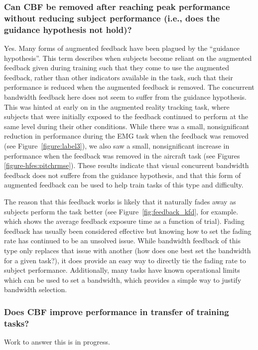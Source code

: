 \subsubsection{Can CBF be removed after reaching peak performance without reducing subject performance (i.e., does the guidance hypothesis not hold)?}
Yes.
Many forms of augmented feedback have been plagued by the ``guidance hypothesis''.
This term describes when subjects become reliant on the augmented feedback given during training such that they come to use the augmented feedback, rather than other indicators available in the task, such that their performance is reduced when the augmented feedback is removed.
The concurrent bandwidth feedback here does not seem to suffer from the guidance hypothesis.
This was hinted at early on in the augmented reality tracking task, where subjects that were initially exposed to the feedback continued to perform at the same level during their other conditions.
While there was a small, nonsignificant reduction in performance during the EMG task when the feedback was removed (see Figure~\ref{figure:label3}), we also saw a small, nonsignificant increase in performance when the feedback was removed in the aircraft task (see Figures \ref{figure-hfes:pitchrmse}).
These results indicate that visual concurrent bandwidth feedback does not suffere from the guidance hypothesis, and that this form of augmented feedback can be used to help train tasks of this type and difficulty.

The reason that this feedback works is likely that it naturally fades away as subjects perform the task better (see Figure~\ref{fig:feedback_kfd}, for example. which shows the average feedback exposure time as a function of trial).
Fading feedback has usually been considered effective but knowing how to set the fading rate has continued to be an unsolved issue.
While bandwidth feedback of this type only replaces that issue with another (how does one best set the bandwidth for a given task?), it does provide an easy way to directly tie the fading rate to subject performance.
Additionally, many tasks have known operational limits which can be used to set a bandwidth, which provides a simple way to justify bandwidth selection.

\subsubsection{Does CBF improve performance in transfer of training tasks?}
Work to answer this is in progress.

